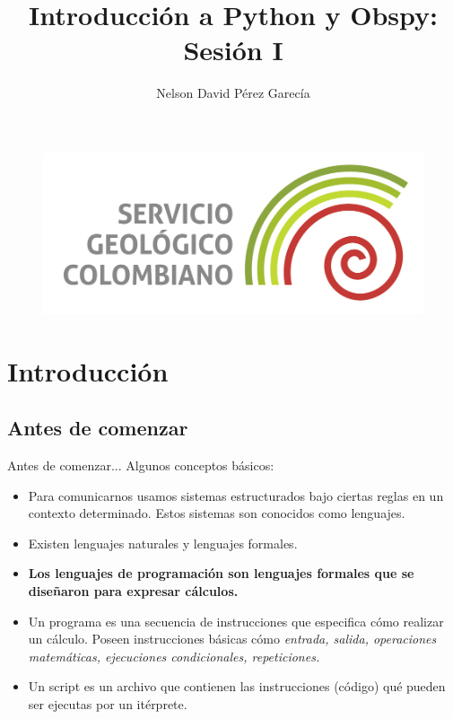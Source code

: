 \documentclass[11pt]{beamer}
\author{Nelson David Pérez Garecía\\}
\title{Introducción a Python y Obspy:\\Sesión I}
\institute{Servicio Geológico Colombiano}
\date{}
\begin{document}
\begin{frame}
\titlepage
\begin{center}
\begin{figure}
\includegraphics[scale=0.15]{Logo-SGC.jpg}
\end{figure}
\end{center}
\end{frame}

\begin{frame}
\tableofcontents
\end{frame}

\section{Introducción}
\subsection{Antes de comenzar}
\begin{frame}{Antes de comenzar...}
Algunos conceptos básicos:
\begin{itemize}
\item Para comunicarnos usamos sistemas estructurados bajo ciertas reglas en un contexto determinado. Estos sistemas son conocidos como lenguajes.
\pause
\item Existen lenguajes naturales y lenguajes formales. 
\pause
\item \textbf{Los lenguajes de programación son lenguajes formales que se diseñaron para expresar cálculos.}
\pause
\item Un programa es una secuencia de instrucciones que especifica cómo realizar un cálculo. Poseen instrucciones básicas cómo \textit{entrada, salida, operaciones matemáticas, ejecuciones condicionales, repeticiones.}
\pause
\item Un script es un archivo que contienen las instrucciones (código) qué pueden ser ejecutas por un itérprete.
\end{itemize}
\end{frame}
\end{document}
